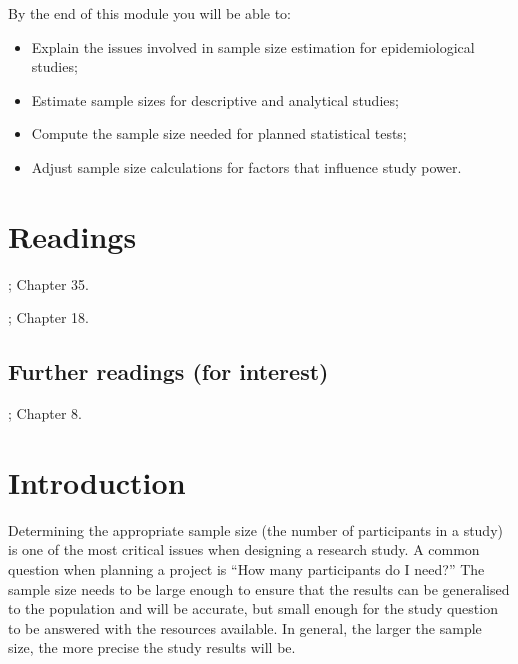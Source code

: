\documentclass[
]{memoir}
\providecommand{\tightlist}{%
  \setlength{\itemsep}{0pt}\setlength{\parskip}{0pt}}
\begin{document}
By the end of this module you will be able to:

\begin{itemize}
\tightlist
\item
  Explain the issues involved in sample size estimation for epidemiological studies;
\item
  Estimate sample sizes for descriptive and analytical studies;
\item
  Compute the sample size needed for planned statistical tests;
\item
  Adjust sample size calculations for factors that influence study power.
\end{itemize}

\hypertarget{readings-9}{%
\section*{Readings}\label{readings-9}}

\citep{kirkwood_sterne01}; Chapter 35.

\citep{bland15}; Chapter 18.

\hypertarget{further-readings-for-interest}{%
\subsection*{Further readings (for interest)}\label{further-readings-for-interest}}

\citet{woodward13}; Chapter 8.

\hypertarget{introduction-7}{%
\section{Introduction}\label{introduction-7}}

Determining the appropriate sample size (the number of participants in a study) is one of the most critical issues when designing a research study. A common question when planning a project is ``How many participants do I need?'' The sample size needs to be large enough to ensure that the results can be generalised to the population and will be accurate, but small enough for the study question to be answered with the resources available. In general, the larger the sample size, the more precise the study results will be.
\end{document}
